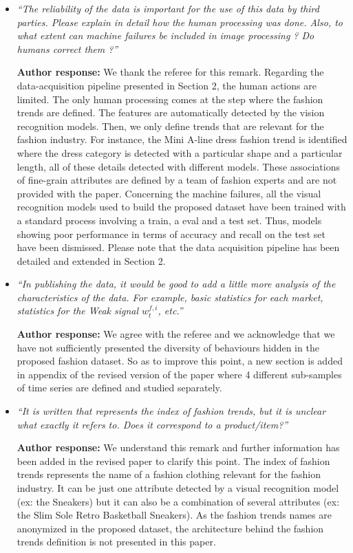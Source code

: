 \documentclass[10pt]{article} %
\begin{document}
\begin{itemize}
	\item {\em ``The reliability of the data is important for the use of this data by third parties. Please explain in detail how the human processing was done. Also, to what extent can machine failures be included in image processing ? Do humans correct them ?''} \medskip
	
	\textbf{Author response:} We thank the referee for this remark. Regarding the data-acquisition pipeline presented in Section 2, the human actions are limited. The only human processing comes at the step where the fashion trends are defined. The features are automatically detected by the vision recognition models. Then, we only define trends that are relevant for the fashion industry. For instance, the Mini A-line dress fashion trend is identified where the dress category is detected with a particular shape and a particular length, all of these details detected with different models. These associations of fine-grain attributes are defined by a team of fashion experts and are not provided with the paper. 
Concerning the machine failures, all the visual recognition models used to build the proposed dataset have been trained with a standard process involving a train, a eval and a test set. Thus, models showing poor performance in terms of accuracy and recall on the test set have been dismissed. Please note that the data acquisition pipeline has been detailed and extended in Section 2. \\
	
	\item {\em ``In publishing the data, it would be good to add a little more analysis of the characteristics of the data. For example, basic statistics for each market, statistics for the Weak signal $w^{f,i}_t$, etc.''} \medskip
	
	\textbf{Author response:} We agree with the referee and we acknowledge that we have not sufficiently presented the diversity of behaviours hidden in the proposed fashion dataset. So as to improve this point, a new section is added in appendix of the revised version of the paper where 4 different sub-samples of time series are defined and studied separately. \\
	
	\item {\em ``It is written that represents the index of fashion trends, but it is unclear what exactly it refers to. Does it correspond to a product/item?''} \medskip

	\textbf{Author response:} We understand this remark and further information has been added in the revised paper to clarify this point. The index of fashion trends represents the name of a fashion clothing relevant for the fashion industry. It can be just one attribute detected by a visual recognition model (ex: the Sneakers) but it can also be a combination of several attributes (ex: the Slim Sole Retro Basketball Sneakers). As the fashion trends names are anonymized in the proposed dataset, the architecture behind the fashion trends definition is not presented in this paper.\\
	

\end{itemize}
\end{document}
